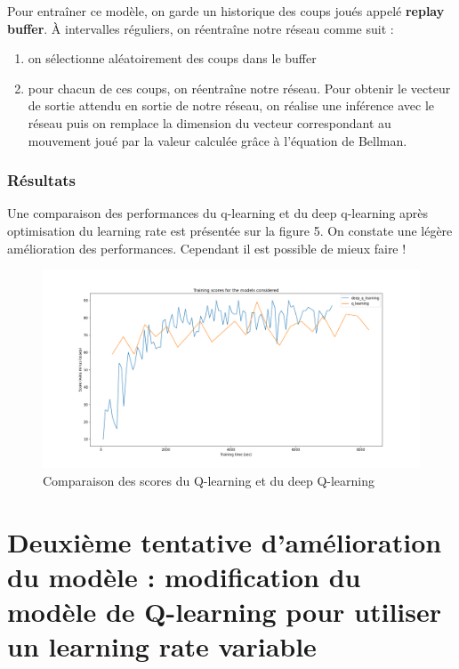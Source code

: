 \documentclass[french]{article}
\begin{document}
    

    Pour entraîner ce modèle, on garde un historique des coups joués appelé \textbf{replay buffer}. À intervalles réguliers, on réentraîne notre réseau comme suit :
    \begin{enumerate}
        \item on sélectionne aléatoirement des coups dans le buffer
        \item pour chacun de ces coups, on réentraîne notre réseau. Pour obtenir le vecteur de sortie attendu en sortie de notre réseau, on réalise une inférence avec le réseau puis on remplace la dimension du vecteur correspondant au mouvement joué par la valeur calculée grâce à l'équation de Bellman.
    \end{enumerate}

    \subsubsection{Résultats}

    Une comparaison des performances du q-learning et du deep q-learning après optimisation du learning rate est présentée sur la figure 5. On constate une légère amélioration des performances. Cependant il est possible de mieux faire !
    
    \begin{figure}[h]
        \includegraphics[width=12cm]{deep_q_learning_metrics}
        \centering
        \caption{Comparaison des scores du Q-learning et du deep Q-learning}
        \centering
    \end{figure}

    \section{Deuxième tentative d'amélioration du modèle : modification du modèle de Q-learning pour utiliser un learning rate variable}
\end{document}
